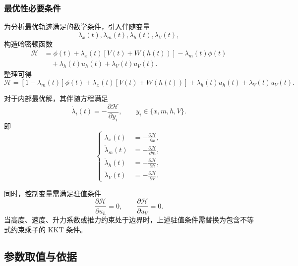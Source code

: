 \documentclass[UTF8]{ctexart}
\begin{document}
\subsubsection{最优性必要条件}

为分析最优轨迹满足的数学条件，引入伴随变量
\[
\lambda_x(t),\lambda_m(t),\lambda_h(t),\lambda_V(t),
\]
构造哈密顿函数
\begin{equation}
\begin{aligned}
    \mathcal H
    &=
    \phi(t)
    +\lambda_x(t)\left[V(t)+W(h(t))\right]
    -\lambda_m(t)\phi(t) \\
    &\quad
    +\lambda_h(t)u_h(t)
    +\lambda_V(t)u_V(t).
\end{aligned}
\label{eq:q3_Hamiltonian}
\end{equation}
整理可得
\begin{equation}
    \mathcal H
    =
    \left[1-\lambda_m(t)\right]\phi(t)
    +\lambda_x(t)\left[V(t)+W(h(t))\right]
    +\lambda_h(t)u_h(t)
    +\lambda_V(t)u_V(t).
    \label{eq:q3_Hamiltonian_simple}
\end{equation}

对于内部最优解，其伴随方程满足
\begin{equation}
    \dot{\lambda}_i(t)
    =
    -\frac{\partial \mathcal H}{\partial y_i},
    \qquad
    y_i\in\{x,m,h,V\}.
    \label{eq:q3_adjoint}
\end{equation}
即
\begin{equation}
\left\{
\begin{aligned}
    \dot\lambda_x(t)&=-\frac{\partial \mathcal H}{\partial x},\\
    \dot\lambda_m(t)&=-\frac{\partial \mathcal H}{\partial m},\\
    \dot\lambda_h(t)&=-\frac{\partial \mathcal H}{\partial h},\\
    \dot\lambda_V(t)&=-\frac{\partial \mathcal H}{\partial V}.
\end{aligned}
\right.
\label{eq:q3_adjoint_system}
\end{equation}

同时，控制变量需满足驻值条件
\begin{equation}
    \frac{\partial \mathcal H}{\partial u_h}=0,
    \qquad
    \frac{\partial \mathcal H}{\partial u_V}=0.
    \label{eq:q3_stationary}
\end{equation}
当高度、速度、升力系数或推力约束处于边界时，上述驻值条件需替换为包含不等式约束乘子的
KKT 条件。
\subsection{参数取值与依据}
\label{sec:params}
\end{document}
